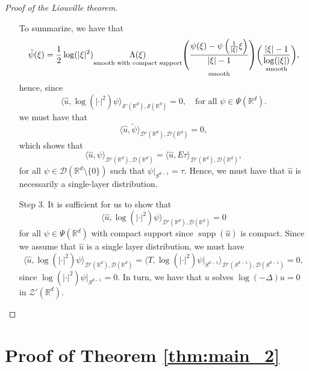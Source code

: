 \documentclass[11pt]{amsart}
\DeclareMathOperator{\supp}{supp}
\newcommand{\R}{\mathbb{R}}
\begin{document}
\begin{proof}[Proof of the Liouville theorem]
\begin{enumerate}
To summarize, we have that 
\begin{equation*}
	\tilde{\psi}(\xi)
	=\frac{1}{2}\log(|\xi|^2)\underset{\textnormal{smooth with compact support}}{\Lambda(\xi)}
		\underset{\textnormal{smooth}}{\left (\frac{\psi(\xi)-\psi\left ( \frac{1}{|\xi|}\xi\right)}{|\xi|-1}\right )}
		\underset{\textnormal{smooth}}{\left (\frac{|\xi|-1}{\log(|\xi|)}\right )},
\end{equation*}
hence, since 
 	\begin{equation*}
\langle \hat{u},\log(|\cdot|^2)\psi\rangle_{\mathcal{S}'(\R^d),\mathcal{S}(\R^d)}=0, \quad \text{for all $\psi \in \Psi(\R^d)$}. 
\end{equation*}
we must have that 
\begin{equation*}
\langle \hat{u},\tilde{\psi}\rangle_{\mathcal{D}'(\R^d),\mathcal{D}(\R^d)}=0,
\end{equation*}
which shows that 
\begin{equation*}
	\langle \hat{u},\psi\rangle_{\mathcal{D}'(\R^d),\mathcal{D}(\R^d)}= 	\langle \hat{u},E\tau\rangle_{\mathcal{D}'(\R^d),\mathcal{D}(\R^d)},
\end{equation*}
for all $\psi\in \mathcal{D}(\R^d\setminus\{0\})$ such that $\psi|_{S^{d-1}}=\tau$. Hence, we must have that $\hat{u}$ is necessarily a single-layer distribution. 
\item[Step 3.] It is sufficient for us to show that 
\begin{equation*}
	\langle \hat{u},\log(|\cdot|^2)\psi\rangle_{\mathcal{D}'(\R^d),\mathcal{D}(\R^d)}=0
\end{equation*}
for all $\psi \in \Psi(\R^d)$ with compact support since $\supp(\hat{u})$ is compact. Since we assume that $\hat{u}$ is a single layer distribution, we must have 
\begin{equation*}
	\langle\hat{u},\log(|\cdot|^2)\psi\rangle_{\mathcal{D}'(\R^d),\mathcal{D}(\R^d)}=\langle T,\log(|\cdot|^2)\psi|_{S^{d-1}}\rangle_{\mathcal{D}'(S^{d-1}),\mathcal{D}(S^{d-1})}=0,
\end{equation*}
since $\log(|\cdot|^2)\psi|_{S^{d-1}}=0$. In turn, we have that $u$ solves $\log(-\Delta)u=0$ in $\mathcal{Z}'(\R^d)$. 

\end{enumerate}
\end{proof}
\section{Proof of Theorem \ref{thm:main_2}}
\label{sec:prop_soln}
\end{document}
